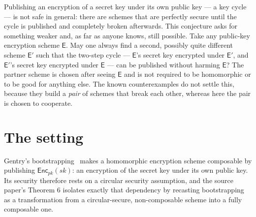 \documentclass{aicr-conjecture}
\newcommand{\Enc}{\mathsf{Enc}}
\begin{document}

\vspace{0.4em}

\begin{informalconjecture}
Publishing an encryption of a secret key under its own public key --- a
key cycle --- is not safe in general: there are schemes that are
perfectly secure until the cycle is published and completely broken
afterwards. This conjecture asks for something weaker and, as far as
anyone knows, still possible. Take any public-key encryption scheme
$\mathsf{E}$. May one always find a second, possibly quite different
scheme $\mathsf{E}'$ such that the two-step cycle --- $\mathsf{E}$'s
secret key encrypted under $\mathsf{E}'$, and $\mathsf{E}'$'s secret
key encrypted under $\mathsf{E}$ --- can be published without harming
$\mathsf{E}$? The partner scheme is chosen after seeing $\mathsf{E}$
and is not required to be homomorphic or to be good for anything else.
The known counterexamples do not settle this, because they build a
\emph{pair} of schemes that break each other, whereas here the pair is
chosen to cooperate.
\end{informalconjecture}

\section{The setting}\label{sec:setting}

Gentry's bootstrapping~\cite{Gen09} makes a homomorphic encryption
scheme composable by publishing $\Enc_{pk}(sk)$: an encryption of the
secret key under its own public key. Its security therefore rests on a
circular security assumption, and the source paper's Theorem 6 isolates
exactly that dependency by recasting bootstrapping as a transformation
from a circular-secure, non-composable scheme into a fully composable
one.
\end{document}
